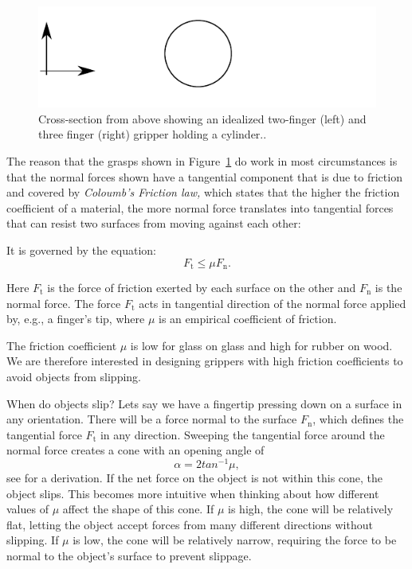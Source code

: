 \begin{figure}
\includegraphics[width=\columnwidth]{figs/idealgrasp}
\caption{Cross-section from above showing an idealized two-finger (left) and three finger (right) gripper holding a cylinder.\label{fig:idealgrasp}.}
\end{figure}

The reason that the grasps shown in Figure~\ref{fig:idealgrasp} do work in most circumstances is that the normal forces shown have a tangential component that is due to friction and covered by \emph{Coloumb's Friction law,}
which states that the higher the friction coefficient of a material, the more normal force translates into tangential forces that can resist two surfaces from moving against each other:

It is governed by the equation:
\begin{equation}
F_\mathrm{t} \leq \mu F_\mathrm{n}.
\end{equation}

Here $F_\mathrm{t}$  is the force of friction exerted by each surface on the other and $F_\mathrm{n}$ is the normal force. The force $F_\mathrm{t}$ acts in tangential direction of the normal force applied by, e.g., a finger's tip, where $\mu$ is an empirical coefficient of friction.

The friction coefficient $\mu$ is low for glass on glass and high for rubber on wood.  We are therefore interested in designing grippers with high friction coefficients to avoid objects from slipping.

When do objects slip? Lets say we have a fingertip pressing down on a surface in any orientation. There will be a force normal to the surface $F_\mathrm{n}$, which defines the tangential force $F_\mathrm{t}$ in any direction. Sweeping the tangential force around the normal force creates a cone with an opening angle of
\begin{equation}
\alpha=2tan^{-1}\mu,
\end{equation}
see \cite[p. 57]{rimon2019mechanics} for a derivation.
If the net force on the object is not within this cone, the object slips.  This becomes more intuitive when thinking about how different values of $\mu$ affect the shape of this cone. If $\mu$ is high, the cone will be relatively flat, letting the object accept forces from many different directions without slipping. If $\mu$ is low, the cone will be relatively narrow, requiring the force to be normal to the object's surface to prevent slippage.


